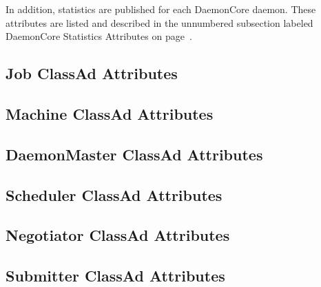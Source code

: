 In addition, statistics are published for each DaemonCore daemon.
These attributes are listed and described in
the unnumbered subsection labeled DaemonCore Statistics Attributes
on page~\pageref{sec:DaemonCore-Statistics-Attributes}.

\subsection*{\label{sec:Job-ClassAd-Attributes}Job ClassAd Attributes}


\subsection*{\label{sec:Machine-ClassAd-Attributes}Machine ClassAd Attributes}


\subsection*{\label{sec:DaemonMaster-ClassAd-Attributes}DaemonMaster ClassAd Attributes}


\subsection*{\label{sec:Scheduler-ClassAd-Attributes}Scheduler ClassAd Attributes}


\subsection*{\label{sec:Negotiator-ClassAd-Attributes}Negotiator ClassAd Attributes}


\subsection*{\label{sec:Submitter-ClassAd-Attributes}Submitter ClassAd Attributes}


